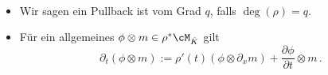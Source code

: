 \begin{bem}~
\begin{itemize}
\item Wir sagen ein Pullback ist vom Grad $q$, falls $\deg(\rho)=q$.
\item Für ein allgemeines $\phi\otimes m\in \rho^{*}\cM_{\hat K}$ gilt
\begin{equation} \label{eq:pull-back-zusammenhang-2}
\partial_t(\phi\otimes m):=\rho'(t)(\phi\otimes\partial_xm) +
  \frac{\partial\phi}{\partial t}\otimes m \,.
\end{equation}
\end{itemize}
\end{bem}
\begin{comment}
Nun wollen wir uns noch genauer mit dem Pullback beschäftigen, und stellen uns
die Frage:
\paragraph{Wie sieht die Wirkung der Derivation auf dem Pullback Zusammenhang
aus?} Für $\rho(t)=t^p$ betrachten wir beispielsweise ein Element der Form
$f(x)m=f(\rho(t))m\in\rho^*\cM_{\hat K}$, dann gilt
\begin{align*}
\partial_x(f(x)m) &= \partial_{\rho(t)}(f(\rho(t))m) \\
  &= f'(\rho(t))\cdot \underset{=1}
  {\underbrace{\frac{\partial(f(t))}{\partial(f(t))}}}m +
  f(\rho(t))\underset{=\partial_x} {\underbrace{\partial_{\rho(t)}}}m
\\&= f'(\rho(t))m + f(\rho(t))\partial_x m
  = (\star)
\\ \rho'(t)^{-1}\partial_t(f(x)m) &= \frac{1}{pt^{p-1}}\partial_t(f(t^p)m)
\\ &= f'(t^p)m+f(t^p)\frac{1}{pt^{p-1}}\partial_t m = (\star) \\
\end{align*}
Also gilt $\partial_t(f(t)m) = \rho'(u)^{-1}\partial_u(f(t)m)$ und somit
lässt sich vermuten, dass die Wirkung von $\partial_x$ gleich der Wirkung von
$\rho'(t)^{-1}\partial_t$ ist. In der Tat stimmt diese Vermutung, wie das
folgende Lemma zeigt.
\end{comment}
\begin{comment}
Sei $f(x)m=f(\rho(t))m\in\rho^*\cM_{\hat K}$. Es gilt, dass
\begin{align*}
\partial_x(f(x)m) &= \partial_{\rho(t)}(f(\rho(t))m) \\
  &= f'(\rho(t))\cdot \underset{=1}
  {\underbrace{\frac{\partial(f(t))}{\partial(f(t))}}}m +
  f(\rho(t))\underset{=\partial_x} {\underbrace{\partial_{\rho(t)}}}m
\\&= f'(\rho(t))m + f(\rho(t))\partial_x m
\\&= f'(t^p)m+f(t^p)\frac{1}{pt^{p-1}}\partial_t m
\\&= \myubracket{\frac{1}{pt^{p-1}}}\partial_t(f(\myubracket{t^p})m)
\\&=\myobracket{\rho'(t)^{-1}}\partial_t(f(\myobracket{x})m) 
\end{align*}
und damit lässt sich vermuten, dass die Wirkung von $\partial_x$ genau die
Wirkung von $\rho'(t)^{-1}\partial_t$ ist. In der Tat ist dies, nach dem
folgenden Satz, wahr.
\end{comment}

